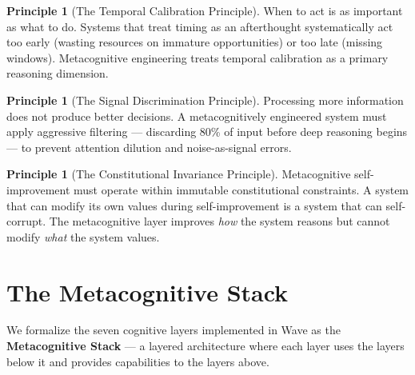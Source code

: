 \documentclass[12pt,a4paper]{article}
\theoremstyle{plain}
\theoremstyle{definition}
\newtheorem{principle}[theorem]{Principle}
\theoremstyle{remark}
\begin{document}
\begin{principle}[The Temporal Calibration Principle]
When to act is as important as what to do. Systems that treat timing as an afterthought systematically act too early (wasting resources on immature opportunities) or too late (missing windows). Metacognitive engineering treats temporal calibration as a primary reasoning dimension.
\end{principle}

\begin{principle}[The Signal Discrimination Principle]
Processing more information does not produce better decisions. A metacognitively engineered system must apply aggressive filtering --- discarding 80\% of input before deep reasoning begins --- to prevent attention dilution and noise-as-signal errors.
\end{principle}

\begin{principle}[The Constitutional Invariance Principle]
Metacognitive self-improvement must operate within immutable constitutional constraints. A system that can modify its own values during self-improvement is a system that can self-corrupt. The metacognitive layer improves \emph{how} the system reasons but cannot modify \emph{what} the system values.
\end{principle}

\section{The Metacognitive Stack}

We formalize the seven cognitive layers implemented in Wave as the \textbf{Metacognitive Stack} --- a layered architecture where each layer uses the layers below it and provides capabilities to the layers above.
\end{document}
